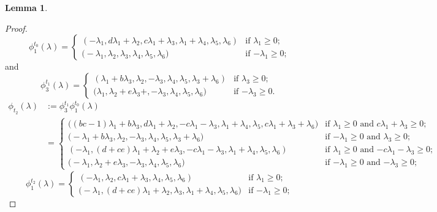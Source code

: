 \documentclass{amsart}
\newtheorem{lemma}[theorem]{Lemma}
\numberwithin{theorem}{section}
\begin{document}
  \begin{lemma}
  \end{lemma}
  \begin{proof}
    \[
      \phi^{t_0}_1(\lambda)
      =
      \begin{cases} 
        (-\lambda_1,d\lambda_1+\lambda_2,c\lambda_1+\lambda_3,\lambda_1+\lambda_4,\lambda_5,\lambda_6) & \text{if $\lambda_1 \ge 0$;}\\
        \big(-\lambda_1,\lambda_2,\lambda_3,\lambda_4,\lambda_5,\lambda_6\big) & \text{if $-\lambda_1 \ge 0$;}
      \end{cases}
    \]
    and
    \[
      \phi^{t_1}_3(\lambda)
      =
      \begin{cases} 
        (\lambda_1+b\lambda_3,\lambda_2,-\lambda_3,\lambda_4,\lambda_5,\lambda_3+\lambda_6) & \text{if $\lambda_3 \ge 0$;}\\
        \big(\lambda_1,\lambda_2+e\lambda_3+,-\lambda_3,\lambda_4,\lambda_5,\lambda_6\big) & \text{if $-\lambda_3 \ge 0$.}
      \end{cases}
    \]
    \begin{align*}
      \phi_{t_2}(\lambda)
      &:=\phi^{t_1}_3\phi^{t_0}_1(\lambda)\\
      &=
      \begin{cases} 
        \big((bc-1)\lambda_1+b\lambda_3,d\lambda_1+\lambda_2,-c\lambda_1-\lambda_3,\lambda_1+\lambda_4,\lambda_5,c\lambda_1+\lambda_3+\lambda_6) & \text{if $\lambda_1 \ge 0$ and $c\lambda_1+\lambda_3 \ge 0$;}\\
        \big(-\lambda_1+b\lambda_3,\lambda_2,-\lambda_3,\lambda_4,\lambda_5,\lambda_3+\lambda_6\big) & \text{if $-\lambda_1 \ge 0$ and $\lambda_3 \ge 0$;} \\
        \hline
        (-\lambda_1,(d+ce)\lambda_1+\lambda_2+e\lambda_3,-c\lambda_1-\lambda_3,\lambda_1+\lambda_4,\lambda_5,\lambda_6) & \text{if $\lambda_1 \ge 0$ and $-c\lambda_1-\lambda_3 \ge 0$;}\\
        \big(-\lambda_1,\lambda_2+e\lambda_3,-\lambda_3,\lambda_4,\lambda_5,\lambda_6\big) & \text{if $-\lambda_1 \ge 0$ and $-\lambda_3 \ge 0$;}
      \end{cases}
    \end{align*}
    \[
      \phi^{t_2}_1(\lambda)
      =
      \begin{cases} 
        (-\lambda_1,\lambda_2,c\lambda_1+\lambda_3,\lambda_4,\lambda_5,\lambda_6) & \text{if $\lambda_1 \ge 0$;}\\
        \big(-\lambda_1,(d+ce)\lambda_1+\lambda_2,\lambda_3,\lambda_1+\lambda_4,\lambda_5,\lambda_6\big) & \text{if $-\lambda_1 \ge 0$;}

\end{cases}\]
\end{proof}
\end{document}

